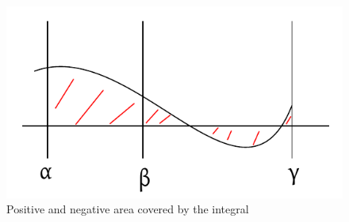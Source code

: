 \documentclass{article}
\begin{document}
\begin{figure}
  \begin{center}
    \includegraphics{img/17_posneg_area.pdf}
    \caption{Positive and negative area covered by the integral}
    \label{img:posneg}
  \end{center}
\end{figure}
\end{document}
